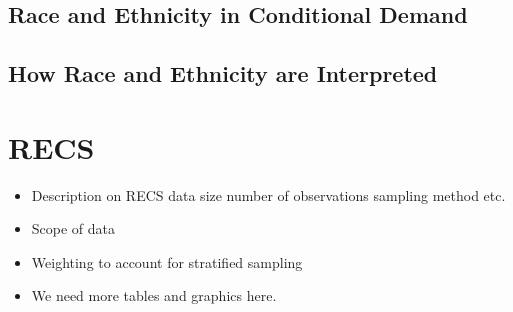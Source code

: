 \documentclass{article}
\begin{document}




  \subsection{Race and Ethnicity in Conditional Demand}
  
  \subsection{How Race and Ethnicity are Interpreted}

\section{RECS}

\begin{itemize}
  \item Description on RECS data size number of observations sampling method etc.
  \item Scope of data  
  \item Weighting to account for stratified sampling
  \item We need more tables and graphics here.
\end{itemize}
\end{document}
